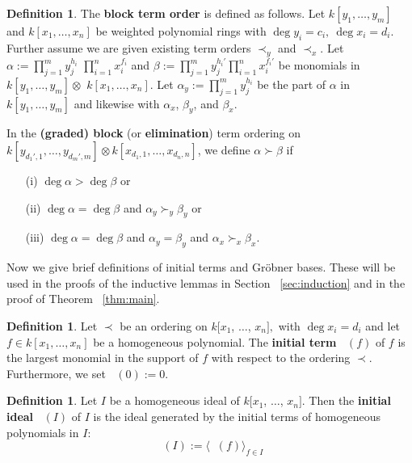 \documentclass{amsart}
\theoremstyle{plain}
\theoremstyle{definition}
\newtheorem{defn}[thm]{Definition}
\theoremstyle{remark}
\numberwithin{equation}{section}
\DeclareMathOperator{\initial}{in_\prec}
\begin{document}
\begin{defn}
\label{defn:block-order}
The \textbf{block term order} is defined as follows. Let $k[y_{1}, \ldots, y_{m}]$ and $k[x_{1}, \ldots,
x_{n}]$ be weighted polynomial rings with $\deg y_i = c_i, \: \deg x_i = d_i.$ Further assume we are given existing term
orders $\prec_y$ and $\prec_x$. Let $\alpha :=
\prod_{j = 1}^{m} y_{j}^{h_i}$ $\prod_{i = 1}^{n} x_{i}
^{f_i}$ and $\beta := \prod_{j = 1}^{m} y_{j}^{h_i'}
\prod_{i = 1}^{n} x_{i}^{f_i'}$ be monomials in $k[y_{1},
\ldots, y_{m}] \otimes$ $k[x_{1}, \ldots, x_{n}]$.
Let $\alpha_y := \prod_{j = 1}^{m} y_{j}^{h_i}$ be the
part of $\alpha$ in $k[y_{1}, \ldots, y_{m}]$ and
likewise with $\alpha_x$, $\beta_y$, and $\beta_x$.

In the \textbf{(graded) block} (or \textbf{elimination}) term
ordering on $k[y_{d_1', 1}, \ldots, y_{d_m', m}] \otimes k[x_{d_1, 1},
\ldots, x_{d_n, n}]$, we define $\alpha \succ \beta$ if
  \begin{enumerate}
	\item[(i)] $\deg \alpha  > \deg \beta$ or
  \item[(ii)] $\deg \alpha = \deg \beta$ and $\alpha_y \succ_y \beta_y$ or
	\item[(iii)] $\deg \alpha = \deg \beta$ and $\alpha_y = \beta_y$ and $\alpha_x \succ_x \beta_x$.
  \end{enumerate}
\end{defn}

Now we give brief definitions of initial terms and Gr\"{o}bner
bases. These will be used in the proofs of the inductive lemmas
in Section ~\ref{sec:induction} and in the proof of Theorem
~\ref{thm:main}.

\begin{defn}
\label{defn:initial-term}
Let $\prec$ be an ordering on $k[x_{1}$, $\ldots$, $x_{n}],$ with $\deg x_i = d_i$ and let $f \in k[x_{1}, \ldots, x_{n}]$ be a homogeneous
polynomial. The \textbf{initial term} $\initial(f)$ of $f$
is the largest monomial in the support of $f$ with respect to
the ordering $\prec$. Furthermore, we set $\initial(0) := 0$.
\end{defn}


\begin{defn}
\label{defn:initial-ideal}
Let $I$ be a homogeneous ideal of $k[x_{1}$, $\ldots$,
$x_{n}]$. Then the {\bf initial ideal} $\initial(I)$ of $I$ is
the ideal generated by the initial terms of homogeneous polynomials
in $I$:
\[
	\initial(I) := \langle \initial(f) \rangle_{f \in I}
\]
\end{defn}
\end{document}
